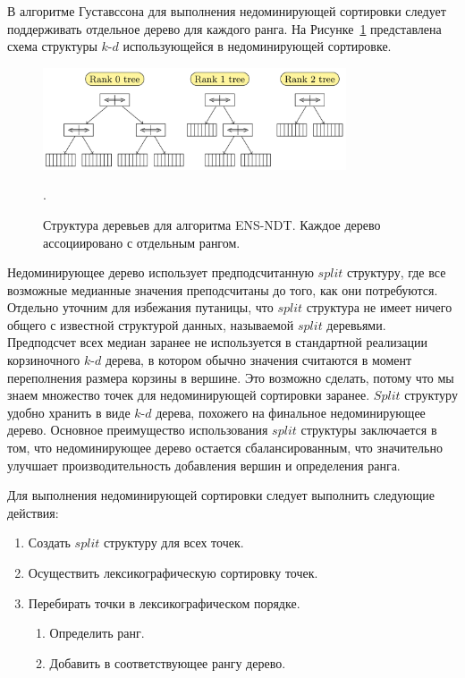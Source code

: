 В алгоритме Густавссона для выполнения недоминирующей сортировки следует поддерживать отдельное дерево для каждого ранга. На Рисунке~\ref{ndtree_original} представлена схема структуры $k$-$d$ использующейся в недоминирующей сортировке.

\begin{figure}[!h]
\begin{center}
\includegraphics[width=0.8\textwidth]{pic/ndtree_original.png}
\caption{Структура деревьев для алгоритма ENS-NDT. Каждое дерево ассоциировано с отдельным рангом.}.
\label{ndtree_original}
\end{center}
\end{figure}

Недоминирующее дерево использует предподсчитанную $split$ структуру, где все возможные медианные значения преподсчитаны до того, как они потребуются. Отдельно уточним для избежания путаницы, что $split$ структура не имеет ничего общего с известной структурой данных, называемой $split$ деревьями. Предподсчет всех медиан заранее не используется в стандартной реализации корзиночного $k$-$d$ дерева, в котором обычно значения считаются в момент переполнения размера корзины в вершине. Это возможно сделать, потому что мы знаем множество точек для недоминирующей сортировки заранее. $Split$ структуру удобно хранить в виде $k$-$d$ дерева, похожего на финальное недоминирующее дерево. Основное преимущество использования $split$ структуры заключается в том, что недоминирующее дерево остается сбалансированным, что значительно улучшает производительность добавления вершин и определения ранга. 

Для выполнения недоминирующей сортировки следует выполнить следующие действия:
\begin{enumerate}
\item Создать $split$ структуру для всех точек.
\item Осуществить лексикографическую сортировку точек.
\item Перебирать точки в лексикографическом порядке.
    \begin{enumerate}
    \item Определить ранг.
    \item Добавить в соответствующее рангу дерево.
    \end{enumerate}
\end{enumerate}

